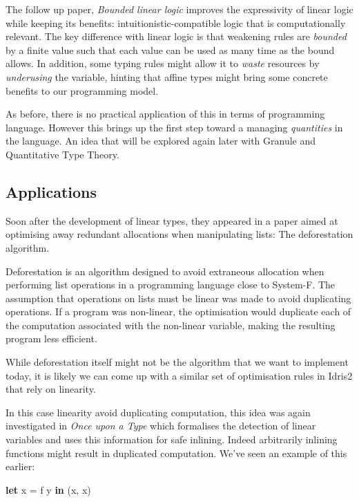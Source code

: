 \documentclass[
]{article}
\newenvironment{Shaded}{}{}
\newcommand{\KeywordTok}[1]{\textcolor[rgb]{0.00,0.44,0.13}{\textbf{#1}}}
\newcommand{\NormalTok}[1]{#1}
\newcommand{\OtherTok}[1]{\textcolor[rgb]{0.00,0.44,0.13}{#1}}
\begin{document}
The follow up paper, \emph{Bounded linear logic}\cite{bll} improves the
expressivity of linear logic while keeping its benefits:
intuitionistic-compatible logic that is computationally relevant. The
key difference with linear logic is that weakening rules are
\emph{bounded} by a finite value such that each value can be used as
many time as the bound allows. In addition, some typing rules might
allow it to \emph{waste} resources by \emph{underusing} the variable,
hinting that affine types might bring some concrete benefits to our
programming model.

As before, there is no practical application of this in terms of
programming language. However this brings up the first step toward a
managing \emph{quantities} in the language. An idea that will be
explored again later with
Granule\cite{granule}\cite{effect_coeffects_grading}\cite{graded_monads_rings}\cite{monads_and_effects}
and Quantitative Type Theory.

\hypertarget{applications}{%
\subsection{Applications}\label{applications}}

Soon after the development of linear types, they appeared in a paper
aimed at optimising away redundant allocations when manipulating lists:
The deforestation algorithm.

Deforestation\cite{deforestations} is an algorithm designed to avoid
extraneous allocation when performing list operations in a programming
language close to System-F. The assumption that operations on lists must
be linear was made to avoid duplicating operations. If a program was
non-linear, the optimisation would duplicate each of the computation
associated with the non-linear variable, making the resulting program
less efficient.

While deforestation itself might not be the algorithm that we want to
implement today, it is likely we can come up with a similar set of
optimisation rules in Idris2 that rely on linearity.

In this case linearity avoid duplicating computation, this idea was
again investigated in \emph{Once upon a Type}\cite{once_upon_a_type}
which formalises the detection of linear variables and uses this
information for safe inlining. Indeed arbitrarily inlining functions
might result in duplicated computation. We've seen an example of this
earlier:

\begin{Shaded}
\begin{Highlighting}[]
\KeywordTok{let}\NormalTok{ x }\OtherTok{=}\NormalTok{ f y }\KeywordTok{in}
\NormalTok{    (x, x)}
\end{Highlighting}
\end{Shaded}
\end{document}
